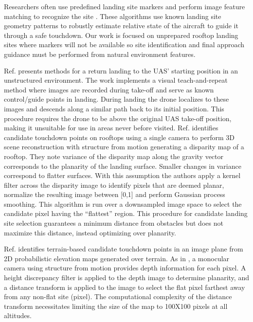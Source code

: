Researchers often use predefined landing site markers and perform image feature matching to recognize the site \cite{shuo_yang_precise_2015, yang_autonomous_2014}. These algorithms use known landing site geometry patterns to robustly estimate relative state of the aircraft to guide it through a safe touchdown.  Our work is focused on unprepared rooftop landing sites where markers will not be available so site identification and final approach guidance must be performed from natural environment features. 

Ref. \cite{pluckter_precision_2020} presents methods for a return landing to the UAS' starting position in an unstructured environment. The work implements a visual teach-and-repeat method where images are recorded during take-off and serve as known control/guide points in landing.   During landing the drone localizes to these images and descends along a similar path back to its initial position. This procedure requires the drone to be above the original UAS take-off position, making it unsuitable for use in areas never before visited. 
Ref. \cite{desaraju_vision-based_2015} identifies candidate touchdown points on rooftops using a single camera to perform 3D scene reconstruction with structure from motion generating a disparity map of a rooftop.  They note variance of the disparity map along the gravity vector corresponds to the planarity of the landing surface. Smaller changes in variance correspond to flatter surfaces. With this assumption the authors apply a kernel filter across the disparity image to identify pixels that are deemed planar, normalize the resulting image between [0,1] and perform Gaussian process smoothing. This algorithm is run over a downsampled image space to select the candidate pixel having the ``flattest'' region. This procedure for candidate landing site selection guarantees a minimum distance from obstacles but does not maximize this distance, instead optimizing over planarity. 

Ref. \cite{forster_continuous_2015} identifies terrain-based candidate touchdown points in an image plane from 2D probabilistic elevation maps generated over terrain. As in \cite{desaraju_vision-based_2015}, a monocular camera using structure from motion provides depth information for each pixel. A height discrepancy filter is applied to the depth image to determine planarity, and a distance transform is applied to the image to select the flat pixel farthest away from any non-flat site (pixel). The computational complexity of the distance transform necessitates limiting the size of the map to 100X100 pixels at all altitudes.

